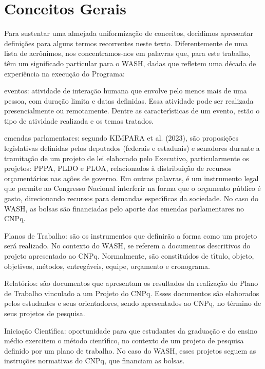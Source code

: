 \documentclass[
12pt,		%
openright,	%
twoside,  %
a4paper,			%
chapter=TITLE,		%
english,			%
french,				%
spanish,			%
brazil				%
]{USPSC-classe/USPSC}
\begin{document}
\section[Conceitos Gerais]{Conceitos Gerais}\label{Conceitos Gerais}
Para sustentar uma almejada uniformiza\c{c}\~ao de conceitos, decidimos apresentar defini\c{c}\~oes para alguns termos recorrentes neste texto. Diferentemente de uma lista de acr\^onimos, nos concentramos-nos em palavras que, para este trabalho, t\^em um significado particular para o  WASH, dadas que refletem uma d\'ecada de experi\^encia na execu\c{c}\~ao do Programa:


















\begin{alineas}
\item eventos: atividade de intera\c{c}\~ao humana que envolve pelo menos mais de uma pessoa, com dura\c{c}\~ao limita e datas definidas. Essa atividade pode ser realizada presencialmente ou remotamente. Dentre as caracter\'{\i}sticas de um evento, est\~ao o tipo de atividade realizada e os temas tratados.
\item emendas parlamentares: segundo  KIMPARA et al. (2023),  \textquotedbl s\~ao proposi\c{c}\~oes legislativas definidas pelos deputados (federais e estaduais) e senadores durante a tramita\c{c}\~ao de um projeto de lei elaborado pelo Executivo, particularmente os projetos: PPPA, PLDO e PLOA\textquotedbl , relacionados \`a distribui\c{c}\~ao de recursos or\c{c}ament\'arios nas a\c{c}\~oes de governo. Em outras palavras, \'e um instrumento legal que permite ao Congresso Nacional interferir na forma que o or\c{c}amento p\'ublico \'e gasto, direcionando recursos para demandas espec\'{\i}ficas da sociedade. No caso do WASH, as bolsas s\~ao financiadas pelo aporte das emendas parlamentares no CNPq.
\item Planos de Trabalho: s\~ao os instrumentos que definir\~ao a forma como um projeto ser\'a realizado. No contexto do WASH, se referem a documentos descritivos do projeto apresentado ao CNPq. Normalmente, s\~ao constitu\'{\i}dos de t\'{\i}tulo, objeto, objetivos, m\'etodos, entreg\'aveis, equipe, or\c{c}amento e cronograma.
\item Relat\'orios: s\~ao documentos que apresentam os resultados da realiza\c{c}\~ao do Plano de Trabalho vinculado a um Projeto do CNPq. Esses documentos s\~ao elaborados pelos estudantes e seus orientadores, sendo apresentados ao CNPq, no t\'ermino de seus projetos de pesquisa.
\item Inicia\c{c}\~ao Cient\'{\i}fica: oportunidade para que estudantes da gradua\c{c}\~ao e do ensino m\'edio exercitem o m\'etodo cient\'{\i}fico, no contexto de um projeto de pesquisa definido por um plano de trabalho. No caso do WASH, esses projetos seguem as instru\c{c}\~oes normativas do CNPq, que financiam as bolsas.
\end{alineas}
\end{document}
